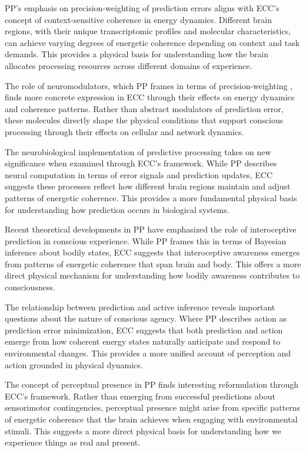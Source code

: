\begin{refsection}
PP's emphasis on precision-weighting of prediction errors \cite{Hohwy2008} aligns with ECC's concept of context-sensitive coherence in energy dynamics. Different brain regions, with their unique transcriptomic profiles and molecular characteristics, can achieve varying degrees of energetic coherence depending on context and task demands. This provides a physical basis for understanding how the brain allocates processing resources across different domains of experience.

The role of neuromodulators, which PP frames in terms of precision-weighting \cite{Seth2014}, finds more concrete expression in ECC through their effects on energy dynamics and coherence patterns. Rather than abstract modulators of prediction error, these molecules directly shape the physical conditions that support conscious processing through their effects on cellular and network dynamics.

The neurobiological implementation of predictive processing \cite{Rao1999} takes on new significance when examined through ECC's framework. While PP describes neural computation in terms of error signals and prediction updates, ECC suggests these processes reflect how different brain regions maintain and adjust patterns of energetic coherence. This provides a more fundamental physical basis for understanding how prediction occurs in biological systems.

Recent theoretical developments in PP \cite{Seth2012} have emphasized the role of interoceptive prediction in conscious experience. While PP frames this in terms of Bayesian inference about bodily states, ECC suggests that interoceptive awareness emerges from patterns of energetic coherence that span brain and body. This offers a more direct physical mechanism for understanding how bodily awareness contributes to consciousness.

The relationship between prediction and active inference \cite{Seth2016} reveals important questions about the nature of conscious agency. Where PP describes action as prediction error minimization, ECC suggests that both prediction and action emerge from how coherent energy states naturally anticipate and respond to environmental changes. This provides a more unified account of perception and action grounded in physical dynamics.

The concept of perceptual presence in PP \cite{Seth2014} finds interesting reformulation through ECC's framework. Rather than emerging from successful predictions about sensorimotor contingencies, perceptual presence might arise from specific patterns of energetic coherence that the brain achieves when engaging with environmental stimuli. This suggests a more direct physical basis for understanding how we experience things as real and present.


\end{refsection}
